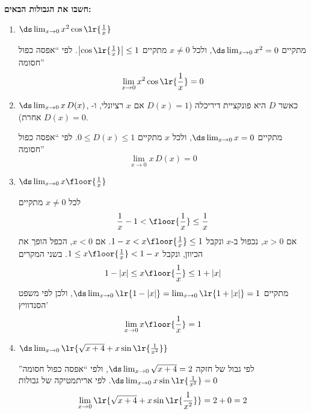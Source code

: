 \textbf{חשבו את הגבולות הבאים:}
\begin{enumerate}
\item $\ds\lim_{x\to0}x^2\cos\lr{\frac1x}$
\ifsol
\begin{solbox}
מתקיים $\ds\lim_{x\to0}x^2=0$, ולכל $x\ne0$ מתקיים $\left|\cos\lr{\frac1x}\right|\le1$. לפי ``אפסה כפול חסומה''
\[\lim_{x\to0}x^2\cos\lr{\frac1x}=0\]
\end{solbox}
\fi
\item $\ds\lim_{x\to0}x\,D(x)$, כאשר $D$ היא פונקציית דיריכלה ($D(x)=1$ אם $x$ רציונלי, ו-$D(x)=0$ אחרת).
\ifsol
\begin{solbox}
מתקיים $\ds\lim_{x\to0}x=0$, ולכל $x$ מתקיים $0\le D(x)\le1$. לפי ``אפסה כפול חסומה''
\[\lim_{x\to0}x\,D(x)=0\]
\end{solbox}
\fi
\item $\ds\lim_{x\to0}x\floor{\frac1x}$
\ifsol
{}
\begin{solbox}
לכל $x\ne0$ מתקיים
\[\frac1x-1<\floor{\frac1x}\le\frac1x\]
אם $x>0$, נכפול ב-$x$ ונקבל $1-x<x\floor{\frac1x}\le1$. אם $x<0$, הכפל הופך את הכיוון, ונקבל $1\le x\floor{\frac1x}<1-x$. בשני המקרים
\[1-|x|\le x\floor{\frac1x}\le1+|x|\]
מתקיים $\ds\lim_{x\to0}\lr{1-|x|}=\lim_{x\to0}\lr{1+|x|}=1$, ולכן לפי משפט הסנדוויץ'
\[\lim_{x\to0}x\floor{\frac1x}=1\]
\end{solbox}
\fi
\item $\ds\lim_{x\to0}\lr{\sqrt{x+4}+x\sin\lr{\frac1{x^2}}}$
\ifsol
\begin{solbox}
לפי גבול של חזקה $\ds\lim_{x\to0}\sqrt{x+4}=2$, ולפי ``אפסה כפול חסומה'' $\ds\lim_{x\to0}x\sin\lr{\frac1{x^2}}=0$. לפי אריתמטיקה של גבולות
\[\lim_{x\to0}\lr{\sqrt{x+4}+x\sin\lr{\frac1{x^2}}}=2+0=2\]
\end{solbox}
\fi
\eMs
\end{enumerate}
